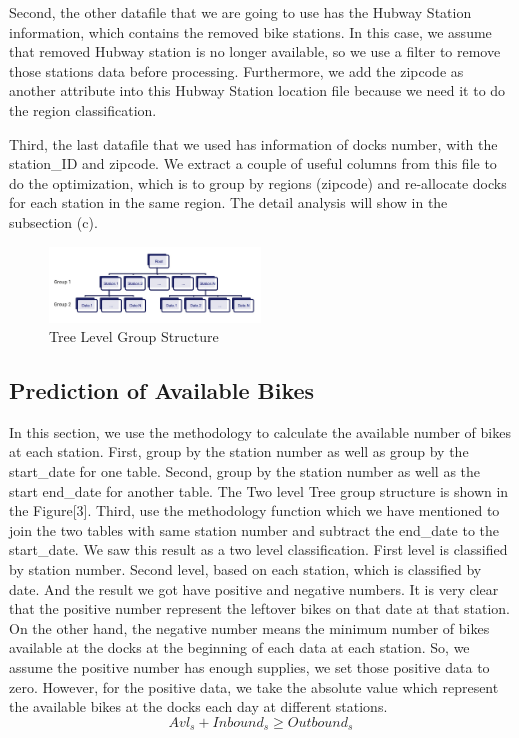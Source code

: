\documentclass[journal, letterpaper]{IEEEtran}
\begin{document}
Second, the other datafile that we are going to use has the Hubway Station information, which contains the removed bike stations. In this case, we assume that removed Hubway station is no longer available, so we use a filter to remove those stations data before processing. Furthermore, we add the zipcode as another attribute into this Hubway Station location file because we need it to do the region classification. 

Third, the last datafile that we used has information of docks number, with the station\_ID and zipcode. We extract a couple of useful columns from this file to do the optimization, which is to group by regions (zipcode) and re-allocate docks for each station in the same region. The detail analysis will show in the subsection (c).

\begin{figure}
  \includegraphics[width=0.5\textwidth]{tree.jpg}
  \caption{Tree Level Group Structure}
  \label{fig:3}
\end{figure}

\subsection{Prediction of Available Bikes}
In this section, we use the methodology to calculate the available number of bikes at each station. First, group by the station number as well as group by the start\_date for one table. Second, group by the station number as well as the start end\_date for another table. The Two level Tree group structure is shown in the Figure[3]. Third, use the methodology function which we have mentioned to join the two tables with same station number and subtract the end\_date to the start\_date. We saw this result as a two level classification. First level is classified by station number. Second level, based on each station, which is classified by date. And the result we got have positive and negative numbers. It is very clear that the positive number represent the leftover bikes on that date at that station. On the other hand, the negative number means the minimum number of bikes available at the docks at the beginning of each data at each station. So, we assume the positive number has enough supplies, we set those positive data to zero. However, for the positive data, we take the absolute value which represent the available bikes at the docks each day at different stations. 
$$Avl_{s} + Inbound_{s} \ge Outbound_{s}$$
\end{document}
